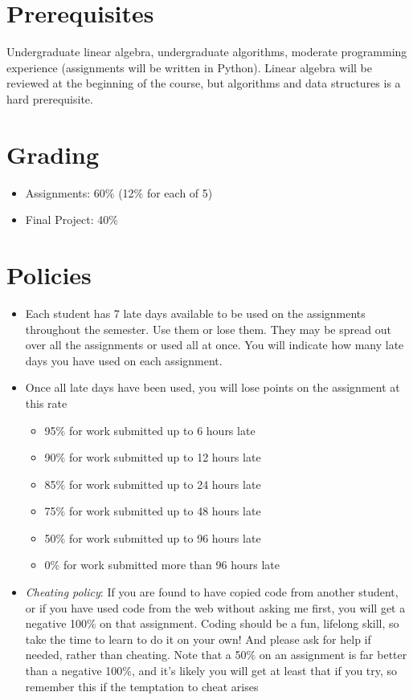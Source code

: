 \documentclass{article}
\begin{document}
\section{Prerequisites}
Undergraduate linear algebra, undergraduate algorithms, moderate programming experience (assignments will be written in Python).  Linear algebra will be reviewed at the beginning of the course, but algorithms and data structures is a hard prerequisite.

\section{Grading}
\begin{itemize}
\item Assignments: 60$\%$ (12$\%$ for each of 5)
\item Final Project: 40$\%$
\end{itemize}

\section{Policies}

\begin{itemize}
\item Each student has 7 late days available to be used on the assignments throughout the semester. Use them or lose them. They may be spread out over all the assignments or used all at once. You will indicate how many late days you have used on each assignment.

\item Once all late days have been used, you will lose points on the assignment at this rate

\begin{itemize}

\item    95$\%$ for work submitted up to 6 hours late
\item    90$\%$ for work submitted up to 12 hours late
\item    85$\%$ for work submitted up to 24 hours late
\item    75$\%$ for work submitted up to 48 hours late
\item    50$\%$ for work submitted up to 96 hours late
\item    0$\%$ for work submitted more than 96 hours late
\end{itemize}

\item {\em Cheating policy}: If you are found to have copied code from another student, or if you have used code from the web without asking me first, you will get a negative 100$\%$ on that assignment. Coding should be a fun, lifelong skill, so take the time to learn to do it on your own! And please ask for help if needed, rather than cheating. Note that a 50$\%$ on an assignment is far better than a negative 100$\%$, and it's likely you will get at least that if you try, so remember this if the temptation to cheat arises

\end{itemize}
\end{document}
